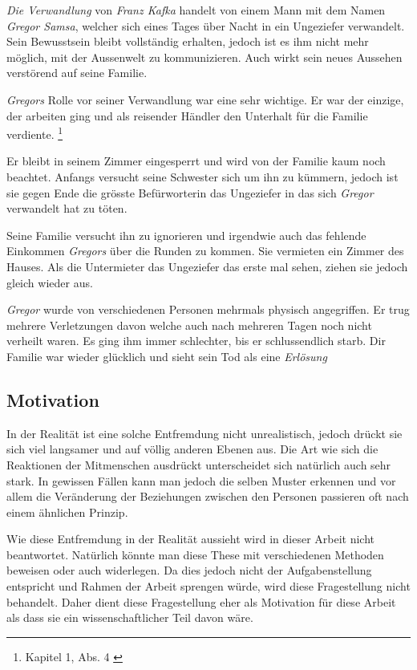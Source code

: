 \documentclass[12pt,a4paper,twoside,titlepage]{article}
\begin{document}
	\textit{Die Verwandlung} von \textit{Franz Kafka} handelt von einem Mann mit dem Namen \textit{Gregor Samsa}, welcher sich eines Tages über Nacht in ein Ungeziefer verwandelt. Sein Bewusstsein bleibt vollständig erhalten, jedoch ist es ihm nicht mehr möglich, mit der Aussenwelt zu kommunizieren. Auch wirkt sein neues Aussehen verstörend auf seine Familie.
	
	\textit{Gregors} Rolle vor seiner Verwandlung war eine sehr wichtige. Er war der einzige, der arbeiten ging und als reisender Händler den Unterhalt für die Familie verdiente. \footnote{Kapitel 1, Abs. 4 \cite{verwandlung}}
	
	Er bleibt in seinem Zimmer eingesperrt und wird von der Familie kaum noch beachtet. Anfangs versucht seine Schwester sich um ihn zu kümmern, jedoch ist sie gegen Ende die grösste Befürworterin das Ungeziefer in das sich \textit{Gregor} verwandelt hat zu töten.
	
	Seine Familie versucht ihn zu ignorieren und irgendwie auch das fehlende Einkommen \textit{Gregors} über die Runden zu kommen. Sie vermieten ein Zimmer des Hauses. Als die Untermieter das Ungeziefer das erste mal sehen, ziehen sie jedoch gleich wieder aus.
	
	\textit{Gregor} wurde von verschiedenen Personen mehrmals physisch angegriffen. Er trug mehrere Verletzungen davon welche auch nach mehreren Tagen noch nicht verheilt waren. Es ging ihm immer schlechter, bis er schlussendlich starb. Dir Familie war wieder glücklich und sieht sein Tod als eine \textit{Erlösung}
	
	\subsection{Motivation}
	
	In der Realität ist eine solche Entfremdung nicht unrealistisch, jedoch drückt sie sich viel langsamer und auf völlig anderen Ebenen aus. Die Art wie sich die Reaktionen der Mitmenschen ausdrückt unterscheidet sich natürlich auch sehr stark. In gewissen Fällen kann man jedoch die selben Muster erkennen und vor allem die Veränderung der Beziehungen zwischen den Personen passieren oft nach einem ähnlichen Prinzip. 
	
	Wie diese Entfremdung in der Realität aussieht wird in dieser Arbeit nicht beantwortet. Natürlich könnte man diese These mit verschiedenen Methoden beweisen oder auch widerlegen. Da dies jedoch nicht der Aufgabenstellung entspricht und Rahmen der Arbeit sprengen würde, wird diese Fragestellung nicht behandelt. Daher dient diese Fragestellung eher als Motivation für diese Arbeit als dass sie ein wissenschaftlicher Teil davon wäre.
	
\end{document}
